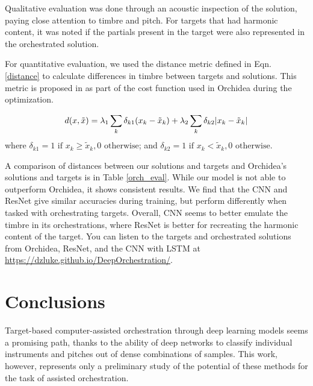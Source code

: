 \documentclass[runningheads,a4paper]{llncs}
\begin{document}

Qualitative evaluation was done through an acoustic inspection of the solution, paying close attention to timbre and pitch. For targets that had harmonic content, it was noted if the partials present in the target were also represented in the orchestrated solution.

For quantitative evaluation, we used the distance metric defined in Eqn. \ref{distance} to calculate differences in timbre between targets and solutions. This metric is proposed in \cite{Cella2020} as part of the cost function used in Orchidea during the optimization. 

\begin{equation}\label{distance}
d(x, \tilde{x}) =\lambda_1 \sum_k \delta_{k1}(x_k - \tilde{x}_k) + \lambda_2 \sum_k \delta_{k2}|x_k - \tilde{x	}_k| \\
\end{equation}
where $\delta_{k1} = 1 \text{  if  } x_k \ge \tilde{x}_k, 0 \text{  otherwise}$; and $\delta_{k2} = 1 \text{  if  } x_k < \tilde{x}_k, 0 \text{  otherwise}$.

A comparison of distances between our solutions and targets and Orchidea's solutions and targets is in Table \ref{orch_eval}. While our model is not able to outperform Orchidea, it shows consistent results. We find that the CNN and ResNet give similar accuracies during training, but perform differently when tasked with orchestrating targets. Overall, CNN seems to better emulate the timbre in its orchestrations, where ResNet is better for recreating the harmonic content of the target. You can listen to the targets and orchestrated solutions from Orchidea, ResNet, and the CNN with LSTM at \url{https://dzluke.github.io/DeepOrchestration/}.


\section{Conclusions}
\label{sec:conclusions}

Target-based computer-assisted orchestration through deep learning models seems a promising path, thanks to the ability of deep networks to classify individual instruments and pitches out of dense combinations of samples. This work, however, represents only a preliminary study of the potential of these methods for the task of assisted orchestration. 
\end{document}
